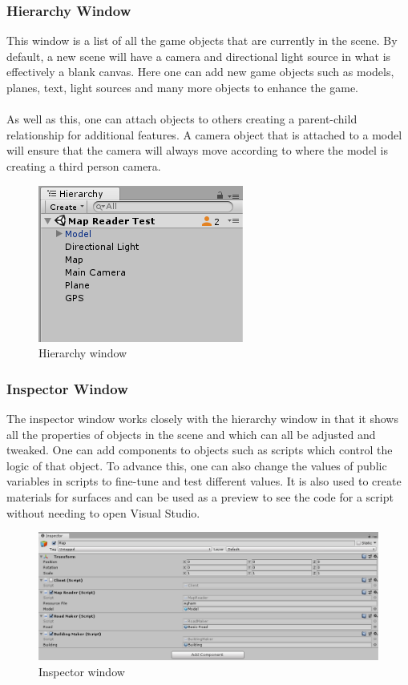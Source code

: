 \documentclass[a4paper]{report}
\begin{document}
\subsubsection{Hierarchy Window}
This window is a list of all the game objects that are currently in the scene. By default, a new scene will have a camera and directional light source in what is effectively a blank canvas. Here one can add new game objects such as models, planes, text, light sources and many more objects to enhance the game. 
\\\\ 
As well as this, one can attach objects to others creating a parent-child relationship for additional features. A camera object that is attached to a model will ensure that the camera will always move according to where the model is creating a third person camera. \cite{Unity}
\begin{figure}[h]
\centering
\includegraphics[scale=1]{hierarchy}
\caption{Hierarchy window}
\end{figure}
\subsubsection{Inspector Window}
The inspector window works closely with the hierarchy window in that it shows all the properties of objects in the scene and which can all be adjusted and tweaked. One can add components to objects such as scripts which control the logic of that object. To advance this, one can also change the values of public variables in scripts to fine-tune and test different values. It is also used to create materials for surfaces and can be used as a preview to see the code for a script without needing to open Visual Studio. \cite{Unity}
\begin{figure}[h]
\centering
\includegraphics[scale=0.55]{inspector}
\caption{Inspector window}
\end{figure}
\end{document}
